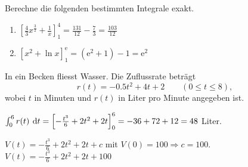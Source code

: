 \documentclass[11pt]{exam}
\begin{document}
\begin{questions}
\newpage
\question[6]
Berechne die folgenden bestimmten Integrale exakt.
{\begin{solution}
		\begin{enumerate}[label=\alph*)]
			\item $\left[\frac{4}{3}x^{\frac{3}{2}} + \frac{1}{x}\right]_1^4 = \frac{131}{12} - \frac{7}{3} = \frac{103}{12}$
			\item $\left[x^2 + \ln{x}\right]_1^{\mathrm{e}} = (\mathrm{e}^2 + 1) - 1 = \mathrm{e}^2$
		\end{enumerate}
\end{solution}}
{}


\newpage
\noaddpoints
\question[\totalpoints]
\addpoints
In ein Becken fliesst Wasser. Die Zuflussrate beträgt
\[r(t) = -0.5t^2 + 4t + 2 \qquad (0 \le t \le 8),\]
wobei $t$ in Minuten und $r(t)$ in Liter pro Minute angegeben ist.
{\begin{solution}
		$\int_0^6 r(t)\:\operatorname{d}\!{t} = \left[-\frac{t^3}{6} + 2t^2 + 2t\right]_0^6 = -36 + 72 + 12 = 48$ Liter.
\end{solution}}
{}
{\begin{solution}
		$V(t) = -\frac{t^3}{6} + 2t^2 + 2t + c$ mit $V(0) = 100 \Rightarrow c = 100$.\\
		$V(t) = -\frac{t^3}{6} + 2t^2 + 2t + 100$
\end{solution}}
{}
\begin{parts}
	\setcounter{partno}{2}

\end{parts}
\end{questions}
\end{document}
